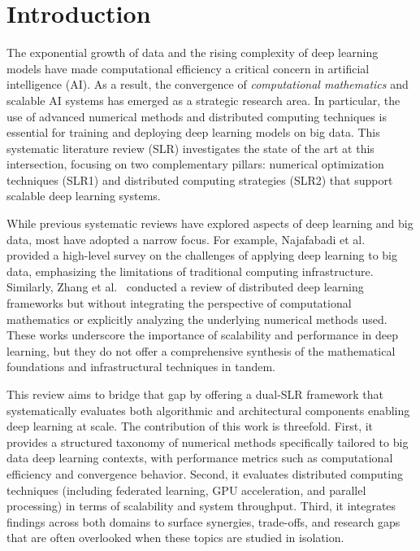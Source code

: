 \documentclass[acmsmall]{acmart}
\begin{document}
\maketitle



\section{Introduction}\label{sec:introduction}


The exponential growth of data and the rising complexity of deep learning models have made computational efficiency a critical concern in 
artificial intelligence (AI). As a result, the convergence of \emph{computational mathematics} and scalable AI systems has emerged as a strategic research area. 
In particular, the use of advanced numerical methods and distributed computing techniques is essential for training and deploying deep learning models on big data.
 This systematic literature review (SLR) investigates the state of the art at this intersection, focusing on two complementary pillars: numerical optimization 
 techniques (SLR1) and distributed computing strategies (SLR2) that support scalable deep learning systems.

While previous systematic reviews have explored aspects of deep learning and big data, most have adopted a narrow focus. 
For example, Najafabadi et al.~\citep{najafabadi2015deep} provided a high-level survey on the challenges of applying deep learning to big data, 
emphasizing the limitations of traditional computing infrastructure. Similarly, Zhang et al.~\citep{zhang2021distributed} conducted a review of distributed 
deep learning frameworks but without integrating the perspective of computational mathematics or explicitly analyzing the underlying numerical methods used. 
These works underscore the importance of scalability and performance in deep learning, but they do not offer a comprehensive synthesis of the mathematical 
foundations and infrastructural techniques in tandem.

This review aims to bridge that gap by offering a dual-SLR framework that systematically evaluates both algorithmic and architectural components enabling deep 
learning at scale. The contribution of this work is threefold. First, it provides a structured taxonomy of numerical methods specifically tailored to big data 
deep learning contexts, with performance metrics such as computational efficiency and convergence behavior. Second, it evaluates distributed 
computing techniques (including federated learning, GPU acceleration, and parallel processing) in terms of scalability and system throughput. 
Third, it integrates findings across both domains to surface synergies, trade-offs, and research gaps that are often overlooked when these topics are studied 
in isolation.
\end{document}

